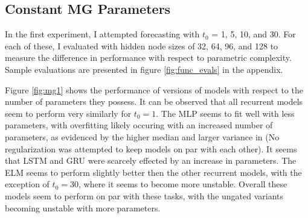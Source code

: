 \documentclass[11pt]{article}
\begin{document}
  \subsection {Constant MG Parameters}
  In the first experiment, I attempted forecasting with $t_0$ = 1,
  5, 10, and 30. For each of these, I evaluated with hidden node sizes of
  32, 64, 96, and 128 to measure the difference in performance with
  respect to parametric complexity.  Sample evaluations are presented
  in figure \ref{fig:func_evals} in the appendix.

  Figure \ref{fig:mg1} shows the performance of versions of models with
  respect to the number of parameters they possess. It can be observed
  that all recurrent models seem to perform very similarly for $t_0 =
  1$. The MLP seems to fit well with less parameters, with overfitting
  likely occuring with an increased number of parameters, as evidenced
  by the higher median and larger variance in (No
  regularization was attempted to keep models on par with each
  other). It seems that LSTM and GRU were scarcely effected by an
  increase in parameters. The ELM seems to perform slightly better
  then the other recurrent models, with the exception of $t_0 = 30$, where it seems to
  become more unstable. Overall these models seem to perform on par
  with these tasks, with the ungated variants becoming unstable with
  more parameters.
\end{document}

